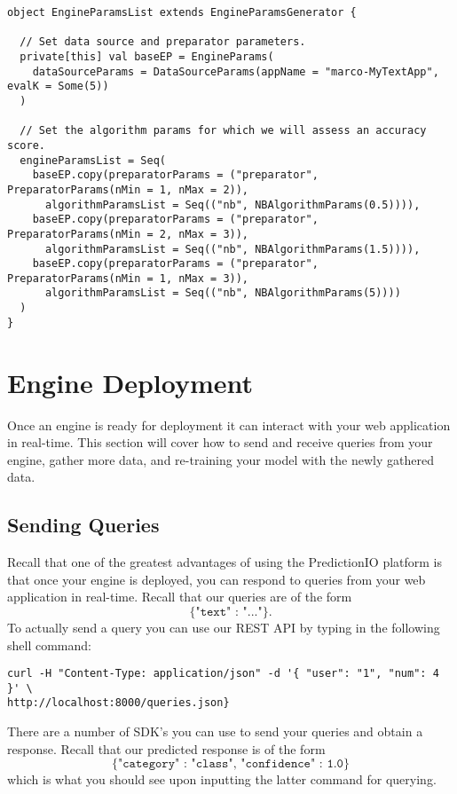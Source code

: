 \documentclass[a4paper,12pt]{article}
\renewcommand{\tt}[1]{\texttt{#1}}
\newcommand{\3}{\left}
\newcommand{\4}{\right}
\renewcommand{\-}[1]{{}^{-#1}}
\begin{document}
\begin{verbatim}
object EngineParamsList extends EngineParamsGenerator {

  // Set data source and preparator parameters.
  private[this] val baseEP = EngineParams(
    dataSourceParams = DataSourceParams(appName = "marco-MyTextApp", evalK = Some(5))
  )

  // Set the algorithm params for which we will assess an accuracy score.
  engineParamsList = Seq(
    baseEP.copy(preparatorParams = ("preparator", PreparatorParams(nMin = 1, nMax = 2)),
      algorithmParamsList = Seq(("nb", NBAlgorithmParams(0.5)))),
    baseEP.copy(preparatorParams = ("preparator", PreparatorParams(nMin = 2, nMax = 3)),
      algorithmParamsList = Seq(("nb", NBAlgorithmParams(1.5)))),
    baseEP.copy(preparatorParams = ("preparator", PreparatorParams(nMin = 1, nMax = 3)),
      algorithmParamsList = Seq(("nb", NBAlgorithmParams(5))))
  )
}
\end{verbatim}

\break

\section*{Engine Deployment}

Once an engine is ready for deployment it can interact with your web application in real-time. This section will cover how to send and receive queries from your engine, gather more data, and re-training your model with the newly gathered data. 

\subsection*{Sending Queries}

Recall that one of the greatest advantages of using the PredictionIO platform is that once your engine is deployed, you can respond to queries from your web application in real-time. Recall that our queries are of the form
$$
\tt{\{"text" : "..."\}}.
$$
To actually send a query you can use our REST API by typing in the following shell command:

\begin{verbatim}
curl -H "Content-Type: application/json" -d '{ "user": "1", "num": 4 }' \
http://localhost:8000/queries.json}
\end{verbatim}

There are a number of SDK's 
you can use to send your queries and obtain a response. Recall that our predicted response is of the form 
$$
\tt{\{"category" : "class", "confidence" : 1.0\}}
$$
which is what you should see upon inputting the latter command for querying.
\end{document}
